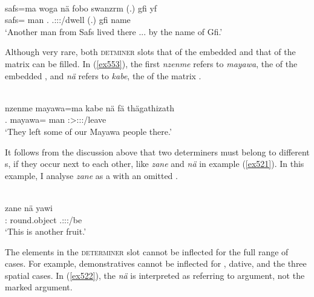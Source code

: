 \begin{exe}
	\\
	\gll safs=ma woga nä fobo swanzrm (.) gfi yf\\
	safs=\Char{} man \Indf{} \Dist.\All{} \Tsg.\Masc:\Sbj:\Nonpast:\Ipfv/dwell (.) gfi name\\
	\trans `Another man from Safs lived there ... by the name of Gfi.'
	\label{ex519}
\end{exe}

Although very rare, both \textsc{detminer} slots \textendash{} that of the embedded  and that of the matrix  \textendash{} can be filled. In (\ref{ex553}), the first   \emph{nzenme} refers to \emph{mayawa}, the  of the embedded , and   \emph{nä} refers to \emph{kabe}, the  of the matrix .

\begin{exe}
	\\
	\gll nzenme mayawa=ma kabe nä fä thägathizath\\
	\Fnsg.\Poss{} mayawa=\Char{} man \Indf{} \Dist{} \Stpl:\Sbj>\Stpl:\Obj:\Pst:\Ipfv/leave\\
	\trans `They left some of our Mayawa people there.'
	\label{ex553}
\end{exe}

It follows from the discussion above that two determiners must belong to different s, if they occur next to each other, like \emph{zane} and \emph{nä} in example (\ref{ex521}). In this example, I analyse \emph{zane} as a  with an omitted .

\begin{exe}
	\\
	\gll zane nä yawi \\
	\Dem:\Prox{} \Indf{} {round.object} \Tsg.\Masc:\Sbj:\Nonpast:\Ipfv/be\\
	\trans `This is another fruit.'
	\label{ex521}
\end{exe}

The elements in the \textsc{determiner} slot cannot be inflected for the full range of cases. For example, demonstratives cannot be inflected for , dative,  and the three spatial cases. In (\ref{ex522}), the  \emph{nä} is interpreted as referring to  argument, not the  marked argument.

